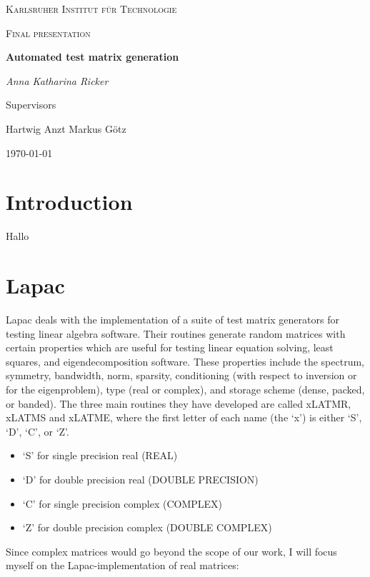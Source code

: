 \documentclass[parskip=full]{scrartcl}
\begin{document}
	
	\begin{titlepage}
		\centering
		{\scshape\LARGE Karlsruher Institut für Technologie\par}
		\vspace{1cm}
		{\scshape\Large Final presentation\par}
		\vspace{1.5cm}
		{\huge\bfseries Automated test matrix generation\par}
		\vspace {2cm}
		
		{\Large\itshape Anna Katharina Ricker\par}
		
		\vfill
		Supervisors\par
		Hartwig Anzt
		Markus G\"{o}tz
		
		\vfill
		{\large\today\par}
	\end{titlepage}
	
	\tableofcontents
	\newpage
	
\section{Introduction}	
Hallo

\section{Lapac}
Lapac deals with the implementation of a suite of test matrix generators for testing linear algebra software. Their routines generate random matrices with certain properties which are useful for testing linear equation solving, least squares, and eigendecomposition software. These properties include the spectrum, symmetry, bandwidth, norm, sparsity, conditioning  (with respect to inversion or for the eigenproblem), type (real or complex), and storage scheme (dense, packed, or banded).
The three main routines they have developed are called xLATMR, xLATMS and xLATME, where the first letter of each name (the `x') is either `S', `D', `C', or `Z'. 
\begin{itemize}
\item ‘S’ for single precision real (REAL)
\item ‘D’ for double precision real (DOUBLE PRECISION)
\item ‘C’ for single precision complex (COMPLEX)
\item ‘Z’ for double precision complex (DOUBLE COMPLEX)
\end{itemize}
Since complex matrices would go beyond the scope of our work, I will focus myself on the Lapac-implementation of real matrices:
\end{document}
